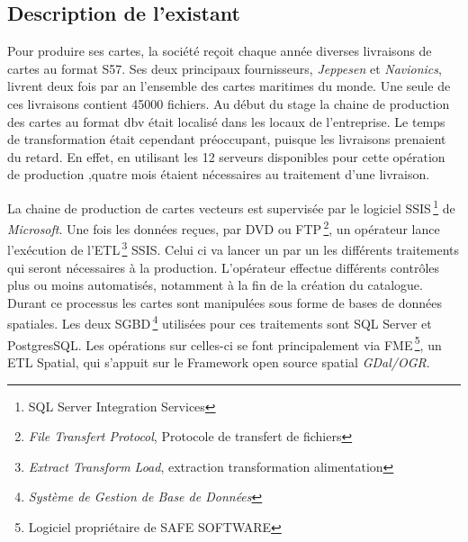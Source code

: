 
\subsection{Description de l'existant}
Pour produire ses cartes, la société \maxsea reçoit chaque année
diverses livraisons de cartes au format S57. Ses deux principaux
fournisseurs, \textit{Jeppesen} et \textit{Navionics}, livrent deux
fois par an l'ensemble des cartes maritimes du monde. Une seule de ces
livraisons contient 45000 fichiers. Au début du stage la chaine de
production des cartes au format dbv était localisé dans les locaux de
l'entreprise. Le temps de transformation était cependant préoccupant,
puisque les livraisons prenaient du retard. En effet, en utilisant les
12 serveurs disponibles pour cette opération de production ,quatre
mois étaient nécessaires au traitement d'une livraison.

La chaine de production de cartes vecteurs est supervisée par le
logiciel SSIS\,\footnote{SQL Server Integration Services} de
\textit{Microsoft}. Une fois les données reçues, par DVD ou
FTP\,\footnote{\textit{File Transfert Protocol}, Protocole de
  transfert de fichiers}, un opérateur lance l'exécution de
l'ETL\,\footnote{\textit{Extract Transform Load}, extraction
  transformation alimentation} SSIS. Celui ci va lancer un par un les
différents traitements qui seront nécessaires à la
production. L'opérateur effectue différents contrôles plus ou moins
automatisés, notamment à la fin de la création du catalogue. Durant ce
processus les cartes sont manipulées sous forme de bases de données
spatiales. Les deux SGBD\,\footnote{\textit{Système de Gestion de Base
    de Données}} utilisées pour ces traitements sont SQL Server et
PostgresSQL. Les opérations sur celles-ci se font principalement via
FME\,\footnote{Logiciel propriétaire de SAFE SOFTWARE}, un ETL
Spatial, qui s'appuit sur le Framework open source spatial
\textit{GDal/OGR}.



